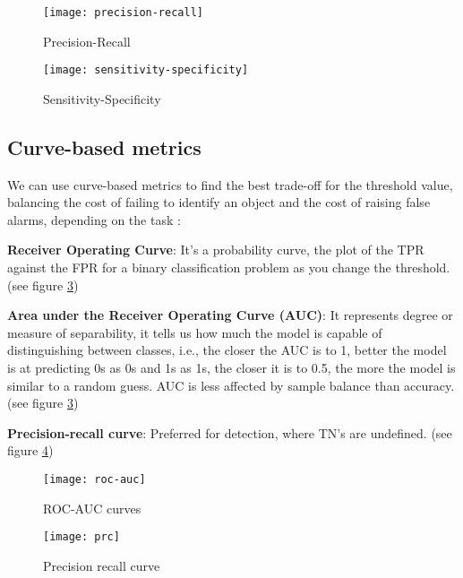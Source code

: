 \begin{minipage}{.5\linewidth}
\begin{figure}[H]
    \centering
    \texttt{[image: precision-recall]}
    \caption[Precision-Recall]{Precision-Recall}
    \label{fig:precision-recall}
\end{figure}
\end{minipage}
\begin{minipage}{.5\linewidth}
\begin{figure}[H]
    \centering
    \texttt{[image: sensitivity-specificity]}
    \caption[Sensitivity-Specificity]{Sensitivity-Specificity}
    \label{fig:sensitivity-specificity}
\end{figure}
\end{minipage}


\subsection{Curve-based metrics}\label{sec:ep-curves}

We can use curve-based metrics to find the best trade-off for the threshold value, balancing the cost of failing to identify an object and the cost of raising false alarms, depending on the task :
\begin{myitem}
    \item \textbf{Receiver Operating Curve}: It's a probability curve, the plot of the TPR against the FPR for a binary classification problem as you change the threshold. (see figure \ref{fig:roc-auc})
    \item \textbf{Area under the Receiver Operating Curve (AUC)}: It represents degree or measure of separability, it tells us how much the model is capable of distinguishing between classes, i.e., the closer the AUC is to 1, better the model is at predicting 0s as 0s and 1s as 1s, the closer it is to 0.5, the more the model is similar to a random guess. AUC is less affected by sample balance than accuracy. (see figure \ref{fig:roc-auc})
    \item \textbf{Precision-recall curve}: Preferred for detection, where TN's are undefined. (see figure \ref{fig:precision-recall-curve})
\end{myitem}

\begin{minipage}{.5\linewidth}
    \begin{figure}[H]
        \centering
        \texttt{[image: roc-auc]}
        \caption[ROC-AUC curves]{ROC-AUC curves}
        \label{fig:roc-auc}
    \end{figure}
\end{minipage}
\begin{minipage}{.5\linewidth}
    \begin{figure}[H]
        \centering
        \texttt{[image: prc]}
        \caption[Precision recall curve]{Precision recall curve}
        \label{fig:precision-recall-curve}
    \end{figure}
\end{minipage}
